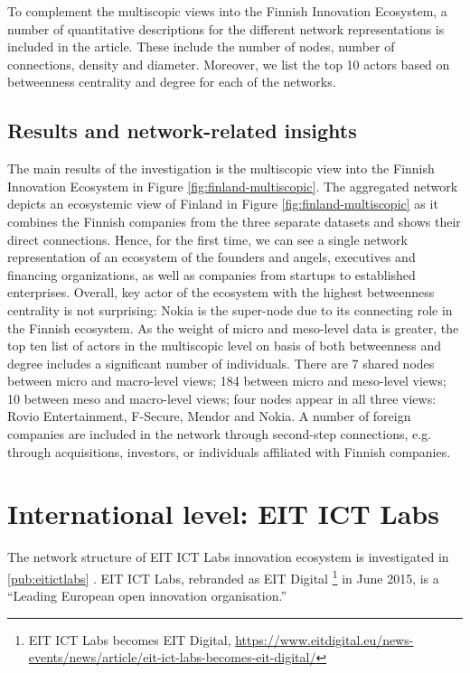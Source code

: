 To complement the multiscopic views into the Finnish Innovation Ecosystem, a number of quantitative descriptions for the different network representations is included in the article. These include the number of nodes, number of connections, density and diameter. Moreover, we list the top 10 actors based on betweenness centrality and degree for each of the networks.

\subsection{Results and network-related insights}

The main results of the investigation is the multiscopic view into the Finnish Innovation Ecosystem in Figure \ref{fig:finland-multiscopic}. The aggregated network depicts an ecosystemic view of Finland in Figure \ref{fig:finland-multiscopic} as it combines the Finnish companies from the three separate datasets and shows their direct connections. Hence, for the first time, we can see a single network representation of an ecosystem of the founders and angels, executives and financing organizations, as well as companies from startups to established enterprises. Overall, key actor of the ecosystem with the highest betweenness centrality is not surprising: Nokia is the super-node due to its connecting role in the Finnish ecosystem. %
As the weight of micro and meso-level data is greater, the top ten list of actors in the multiscopic level on basis of both betweenness and degree includes a significant number of individuals. There are 7 shared nodes between micro and macro-level views; 184 between micro and meso-level views; 10 between meso and macro-level views; four nodes appear in all three views: Rovio Entertainment, F-Secure, Mendor and Nokia. A number of foreign companies are included in the network through second-step connections, e.g. through acquisitions, investors, or individuals affiliated with Finnish companies.

\section{International level: EIT ICT Labs}

The network structure of EIT ICT Labs innovation ecosystem is investigated in \ref{pub:eitictlabs} \citep{Still2014InsightsVisualisations}. EIT ICT Labs, rebranded as EIT Digital \footnote{EIT ICT Labs becomes EIT Digital, \url{https://www.eitdigital.eu/news-events/news/article/eit-ict-labs-becomes-eit-digital/}} in June 2015, is a ``Leading European open innovation organisation.'' 

